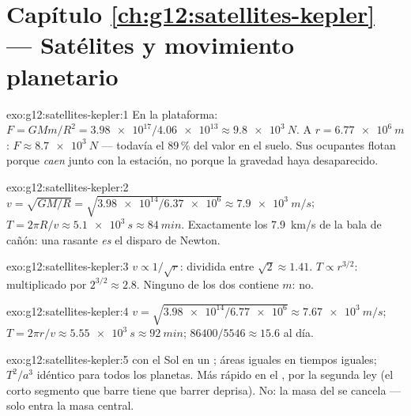 \section*{Capítulo \ref{ch:g12:satellites-kepler} --- Satélites y movimiento planetario}

\begin{solution}{exo:g12:satellites-kepler:1}
En la plataforma: $F = GMm/R^2 = \num{3.98e17}/\num{4.06e13} \approx
\qty{9.8e3}{N}$. A $r = \qty{6.77e6}{m}$: $F \approx \qty{8.7e3}{N}$ ---
todavía el $89\,\%$ del valor en el suelo. Sus ocupantes flotan porque
\emph{caen} junto con la estación, no porque la gravedad haya
desaparecido.
\end{solution}

\begin{solution}{exo:g12:satellites-kepler:2}
$v = \sqrt{GM/R} = \sqrt{\num{3.98e14}/\num{6.37e6}} \approx
\qty{7.9e3}{m/s}$; $T = 2\pi R/v \approx \qty{5.1e3}{s} \approx
\qty{84}{min}$. Exactamente los \qty{7.9}{km/s} de la bala de cañón: una
 rasante \emph{es} el disparo de Newton.
\end{solution}

\begin{solution}{exo:g12:satellites-kepler:3}
$v \propto 1/\sqrt{r}$: dividida entre $\sqrt 2 \approx 1.41$.
$T \propto r^{3/2}$: multiplicado por $2^{3/2} \approx 2.8$. Ninguno de
los dos contiene $m$: no.
\end{solution}

\begin{solution}{exo:g12:satellites-kepler:4}
$v = \sqrt{\num{3.98e14}/\num{6.77e6}} \approx \qty{7.67e3}{m/s}$;
$T = 2\pi r/v \approx \qty{5.55e3}{s} \approx \qty{92}{min}$;
$\num{86400}/5546 \approx 15.6$  al día.
\end{solution}

\begin{solution}{exo:g12:satellites-kepler:5}
 con el Sol en un ; áreas iguales en tiempos iguales;
$T^2/a^3$ idéntico para todos los planetas. Más rápido en el ,
por la segunda ley (el corto segmento que barre tiene que barrer
deprisa). No: la masa del  se cancela --- solo entra la masa
central.
\end{solution}

